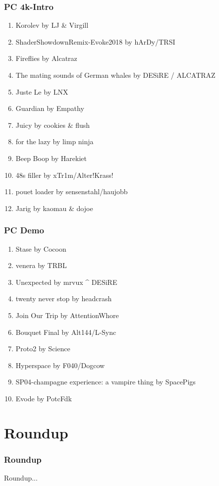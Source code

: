 \documentclass{beamer}
\begin{document}
\begin{frame}
  \frametitle{PC 4k-Intro}
  \begin{enumerate}
  \item Korolev by LJ \& Virgill
  \item ShaderShowdownRemix-Evoke2018 by hArDy/TRSI
  \item Fireflies by Alcatraz
  \item The mating sounds of German whales by DESiRE / ALCATRAZ
  \item Juste Le by LNX
  \item Guardian by Empathy
  \item Juicy by cookies \& flush
  \item for the lazy by limp ninja
  \item Beep Boop by Harekiet
  \item 48s filler by xTr1m/Alter!Krass!
  \item pouet loader by sensenstahl/haujobb
  \item Jarig by kaomau \& dojoe
  \end{enumerate}
\end{frame}

\begin{frame}
  \frametitle{PC Demo}
  \begin{enumerate}
  \item Stase by Cocoon
  \item venera by TRBL
  \item Unexpected by mrvux \^{} DESiRE
  \item twenty never stop by headcrash
  \item Join Our Trip by AttentionWhore
  \item Bouquet Final by Alt144/L-Sync
  \item Proto2 by Science
  \item Hyperspace by F040/Dogcow
  \item SP04-champagne experience: a vampire thing by SpacePigs
  \item Evode by PotcFdk
  \end{enumerate}
\end{frame}



\section{Roundup}
\begin{frame}
  \frametitle{Roundup}
  Roundup...
\end{frame}
\end{document}
